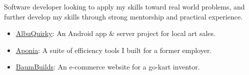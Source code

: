 \smallskip

\raggedright
{}
  Software developer looking to apply my skills toward real world problems, and further develop my skills through strong mentorship and practical experience.

  \medskip


\raggedright
{}
  \centering

  \divider
  
  \divider


  \medskip


\raggedright
{}
  \centering

  \divider


  \medskip


\raggedright
{}
  \begin{itemize}
    \item \href{https://albuquirky.github.io/}{\underline{AlbuQuirky}}: An Android app \& server project for local art sales.
    \item \href{https://github.com/AugmenTab/work-tools}{\underline{Aponia}}: A suite of efficiency tools I built for a former employer.
    \item \href{https://baumbuilds.com}{\underline{BaumBuilds}}: An e-commerce website for a go-kart inventor.
  \end{itemize}
